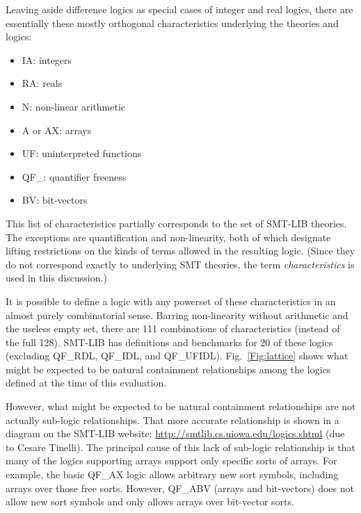 \documentclass[smallcondensed]{svjour3}
\begin{document}
Leaving aside difference logics as special cases of integer and real logics, there are essentially these mostly orthogonal characteristics underlying the theories and logics:
\begin{itemize}[noitemsep,nolistsep] %
\item IA: integers 
\item RA: reals
\item N: non-linear arithmetic
\item A or AX: arrays
\item UF: uninterpreted functions
\item QF\_: quantifier freeness
\item BV: bit-vectors
\end{itemize}
This list of characteristics partially corresponds to the set of SMT-LIB theories. The exceptions are quantification and non-linearity, both of which designate lifting restrictions on the kinds of terms allowed in the resulting logic. (Since they do not correspond exactly to underlying SMT theories, the term {\em characteristics} is used in this discussion.)

It is possible to define a logic with any powerset of these characteristics in an almost purely combinatorial sense. 
Barring non-linearity without arithmetic and the useless empty set, there are 111 combinations of characteristics (instead of the full 128). SMT-LIB has definitions and benchmarks for 20 of these logics (excluding QF\_RDL, QF\_IDL, and QF\_UFIDL). Fig.~\ref{Fig:lattice} shows what might be expected to be natural containment relationships among the logics defined at the time of this evaluation. 

However, what might be expected to be natural containment relationships are not actually sub-logic relationships. That more accurate relationship is shown in a diagram on the SMT-LIB website: \url{http://smtlib.cs.uiowa.edu/logics.shtml} (due to Cesare Tinelli). The principal cause of this lack of sub-logic relationship is that many of the logics supporting arrays support only specific sorts of arrays. For example, the basic QF\_AX logic allows arbitrary new sort symbols, including arrays over those free sorts. However, QF\_ABV (arrays and bit-vectors) does not allow new sort symbols and only allows arrays over bit-vector sorts.
\end{document}
